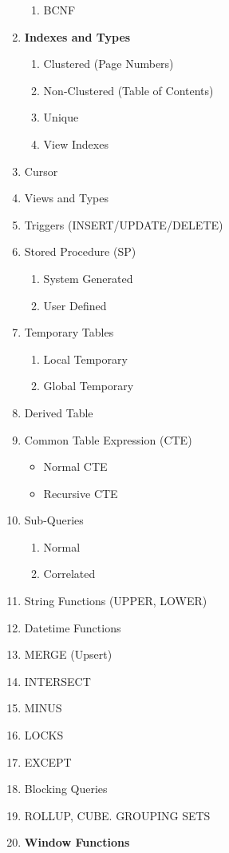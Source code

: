 \documentclass[11pt]{article}
\begin{document}
\begin{enumerate}
\begin{enumerate}
		\item BCNF		
	\end{enumerate}
\item \textbf{Indexes and Types}
\begin{enumerate}
	\item Clustered (Page Numbers)
	\item Non-Clustered (Table of Contents)
	\item Unique
	\item View Indexes
\end{enumerate}
\item Cursor
\item Views and Types 
\item Triggers (INSERT/UPDATE/DELETE)
\item Stored Procedure (SP)
\begin{enumerate}
	\item System Generated
	\item User Defined
\end{enumerate}
\item Temporary Tables
\begin{enumerate}
	\item Local Temporary
	\item Global Temporary
\end{enumerate}
\item Derived Table
\item Common Table Expression (CTE)
\begin{itemize}
	\item Normal CTE
	\item Recursive CTE
\end{itemize}
\item Sub-Queries
\begin{enumerate}
	\item Normal
	\item Correlated
\end{enumerate}
\item String Functions (UPPER, LOWER)
\item Datetime Functions
\item MERGE (Upsert)
 \item INTERSECT
\item MINUS
\item LOCKS
\item EXCEPT
\item Blocking Queries
\item ROLLUP, CUBE. GROUPING SETS
\item \textbf{Window Functions}

\end{enumerate}
\end{document}
